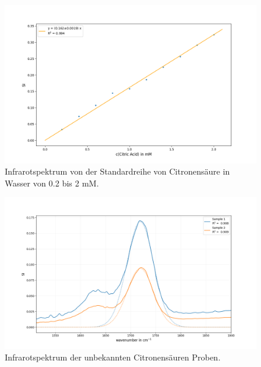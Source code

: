 \documentclass[10pt,a4paper]{article}
\begin{document}
		\begin{figure}[H]
			\centering
			\includegraphics[scale=0.60]{Standardcurve_Fit.png}
			\caption{Infrarotspektrum von der Standardreihe von Citronensäure in Wasser von 0.2 bis 2 mM. }
			\label{fig:Standardcurve}
		\end{figure}
		
		\begin{figure}[H]
			\centering
			\includegraphics[scale=0.55]{unknown_sample_fit.png}
			\caption{Infrarotspektrum der unbekannten Citronensäuren Proben.}
			\label{fig:IR_unknown}
		\end{figure}
\end{document}

